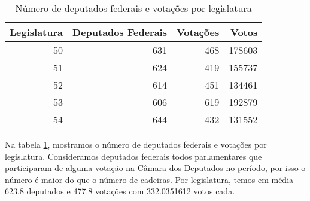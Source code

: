 \begin{table}
\centering
\begin{knitrout}
\color{fgcolor}\begin{kframe}
\begin{alltt}
 \hlkwb{=} \hlstd{(}
 \hlkwb{=} \hlstd{(} \hlopt{-} 
 \hlkwb{=} \hlstd{(}  \hlstd{(}\hlstd{) \{}
   \hlkwb{=} \hlstd{v[,} \hlopt{-}\hlstd{(}\hlopt{:}\hlstd{)]}
   \hlopt{==}  \hlopt{|}  \hlopt{==} \hlstd{,}  \hlstd{=} \hlstd{)}
\hlstd{\}))}
 \hlkwb{=} \hlstd{(} 
                   
                   
                   

       \hlstd{=} \hlstd{,}
       \hlstd{=} \hlstd{(}\hlstd{,} \hlstd{,} \hlstd{,} \hlstd{))}
\end{alltt}
\end{kframe}
\begin{tabular}{r|r|r|r}
\hline
Legislatura & Deputados Federais & Votações & Votos\\
\hline
50 & 631 & 468 & 178603\\
\hline
51 & 624 & 419 & 155737\\
\hline
52 & 614 & 451 & 134461\\
\hline
53 & 606 & 619 & 192879\\
\hline
54 & 644 & 432 & 131552\\
\hline
\end{tabular}


\end{knitrout}
\caption{Número de deputados federais e votações por legislatura}
\label{table:estatisticas-legislaturas}
\end{table}

Na tabela \ref{table:estatisticas-legislaturas}, mostramos o número de
deputados federais e votações por legislatura. Consideramos deputados federais
todos parlamentares que participaram de alguma votação na Câmara dos Deputados
no período, por isso o número é maior do que o número de cadeiras. Por
legislatura, temos em média 623.8 deputados e 477.8
votações com 332.0351612 votos cada.

